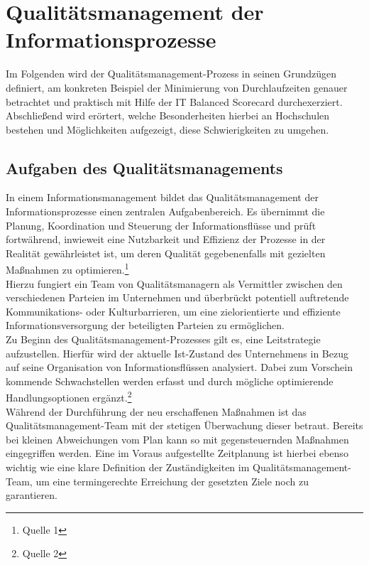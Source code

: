 \section{Qualitätsmanagement der Informationsprozesse}
Im Folgenden wird der Qualitätsmanagement-Prozess in seinen Grundzügen definiert, am konkreten Beispiel der Minimierung von Durchlaufzeiten genauer betrachtet und praktisch mit Hilfe der IT Balanced Scorecard durchexerziert. Abschließend wird erörtert, welche Besonderheiten hierbei an Hochschulen bestehen und Möglichkeiten aufgezeigt, diese Schwierigkeiten zu umgehen.

\subsection{Aufgaben des Qualitätsmanagements}
In einem Informationsmanagement bildet das Qualitätsmanagement der Informationsprozesse einen zentralen Aufgabenbereich. Es übernimmt die Planung, Koordination und Steuerung der Informationsflüsse und prüft fortwährend, inwieweit eine Nutzbarkeit und Effizienz der Prozesse in der Realität gewährleistet ist, um deren Qualität gegebenenfalls mit gezielten Maßnahmen zu optimieren.\footnote{Quelle 1}\\

Hierzu fungiert ein Team von Qualitätsmanagern als Vermittler zwischen den verschiedenen Parteien im Unternehmen und überbrückt potentiell auftretende Kommunikations- oder Kulturbarrieren, um eine zielorientierte und effiziente Informationsversorgung der beteiligten Parteien zu ermöglichen.\\

Zu Beginn des Qualitätsmanagement-Prozesses gilt es, eine Leitstrategie aufzustellen. Hierfür wird der aktuelle Ist-Zustand des Unternehmens in Bezug auf seine Organisation von Informationsflüssen analysiert. Dabei zum Vorschein kommende Schwachstellen werden erfasst und durch mögliche optimierende Handlungsoptionen ergänzt.\footnote{Quelle 2}\\

Während der Durchführung der neu erschaffenen Maßnahmen ist das Qualitätsmanagement-Team mit der stetigen Überwachung dieser betraut. Bereits bei kleinen Abweichungen vom Plan kann so mit gegensteuernden Maßnahmen eingegriffen werden. Eine im Voraus aufgestellte Zeitplanung ist hierbei ebenso wichtig wie eine klare Definition der Zuständigkeiten im Qualitätsmanagement-Team, um eine termingerechte Erreichung der gesetzten Ziele noch zu garantieren.\\

